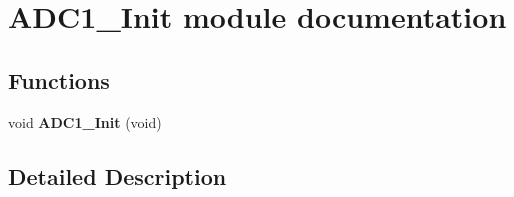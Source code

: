 \hypertarget{group___a_d_c1___init__module}{}\section{A\+D\+C1\+\_\+\+Init module documentation}
\label{group___a_d_c1___init__module}
\subsection*{Functions}
\begin{DoxyCompactItemize}
\item 
void {\bfseries A\+D\+C1\+\_\+\+Init} (void)\hypertarget{group___a_d_c1___init__module_ga4aee6db188db234c1dcf4d17cc24eb03}{}\label{group___a_d_c1___init__module_ga4aee6db188db234c1dcf4d17cc24eb03}

\end{DoxyCompactItemize}


\subsection{Detailed Description}
